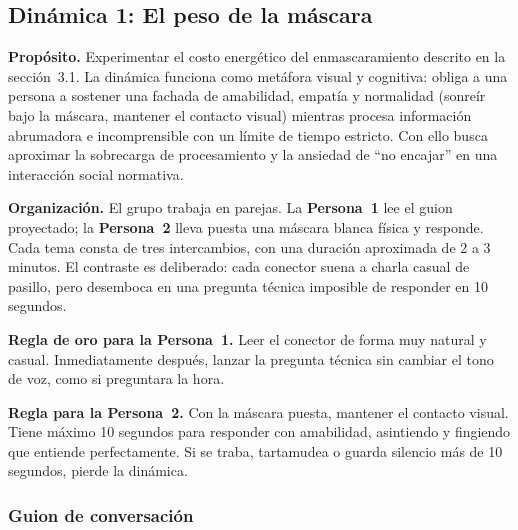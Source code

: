 \subsection{Dinámica 1: El peso de la máscara}

\textbf{Propósito.} Experimentar el costo energético del enmascaramiento descrito en la sección~3.1. La dinámica funciona como metáfora visual y cognitiva: obliga a una persona a sostener una fachada de amabilidad, empatía y normalidad (sonreír bajo la máscara, mantener el contacto visual) mientras procesa información abrumadora e incomprensible con un límite de tiempo estricto. Con ello busca aproximar la sobrecarga de procesamiento y la ansiedad de \enquote{no encajar} en una interacción social normativa.

\textbf{Organización.} El grupo trabaja en parejas. La \textbf{Persona~1} lee el guion proyectado; la \textbf{Persona~2} lleva puesta una máscara blanca física y responde. Cada tema consta de tres intercambios, con una duración aproximada de 2 a 3 minutos. El contraste es deliberado: cada conector suena a charla casual de pasillo, pero desemboca en una pregunta técnica imposible de responder en 10 segundos.

\textbf{Regla de oro para la Persona~1.} Leer el conector de forma muy natural y casual. Inmediatamente después, lanzar la pregunta técnica sin cambiar el tono de voz, como si preguntara la hora.

\textbf{Regla para la Persona~2.} Con la máscara puesta, mantener el contacto visual. Tiene máximo 10 segundos para responder con amabilidad, asintiendo y fingiendo que entiende perfectamente. Si se traba, tartamudea o guarda silencio más de 10 segundos, pierde la dinámica.

\subsubsection*{Guion de conversación}

